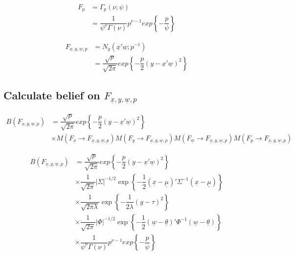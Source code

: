 \documentclass[fleqn]{minimal}
\begin{document}
\begin{align*}
  F_{p}
  & = \Gamma_p
  \left(
    \nu ;
    \psi
  \right) \\
  & = \dfrac{1}{\psi^\nu \Gamma(\nu)}
  p^{\nu-1}
  exp
  \left\{
    - \dfrac{p}{\psi}
  \right\}
\end{align*}

\begin{align*}
  F_{\underline{x}, y, \underline{w}, p}
  & = N_y
  \left(
    \underline{x}'\underline{w} ;
    p^{-1}
  \right) \\
  & =\dfrac{\sqrt{p}}{\sqrt{2\pi}}
  exp
  \left\{
    - \dfrac{p}{2}
    \left( y - \underline{x}'\underline{w} \right)^2
  \right\}
\end{align*}

\subsection{Calculate belief on $F_{\underline{x}, y, \underline{w}, p}$}

\begin{align*}
  B\left(F_{\underline{x}, y, \underline{w}, p}\right)
  & = \dfrac{\sqrt{p}}{\sqrt{2\pi}}
  exp
  \left\{
    - \dfrac{p}{2}
    \left( y - \underline{x}'\underline{w} \right)^2
  \right\} \\
  & \times
  M\left(F_{\underline{x}} \rightarrow F_{\underline{x}, y, \underline{w}, p}\right)
  M\left(F_{y} \rightarrow F_{\underline{x}, y, \underline{w}, p}\right)
  M\left(F_{\underline{w}} \rightarrow F_{\underline{x}, y, \underline{w}, p}\right)
  M\left(F_{p} \rightarrow F_{\underline{x}, y, \underline{w}, p}\right)
\end{align*}

\begin{align*}
  B\left(F_{\underline{x}, y, \underline{w}, p}\right)
  & = \dfrac{\sqrt{p}}{\sqrt{2\pi}}
  exp
  \left\{
    - \dfrac{p}{2}
    \left( y - \underline{x}'\underline{w} \right)^2
  \right\} \\
  & \times
  \dfrac{1}{\sqrt{2\pi}}
  \left| \Sigma \right|^{-1/2}
  \exp
  \left\{
    - \dfrac{1}{2}
    \left( \underline{x} - \underline{\mu}\right)'
    \Sigma^{-1}
    \left( \underline{x} - \underline{\mu}\right)
  \right\} \\
  & \times
  \dfrac{1}{\sqrt{2\pi\lambda}}
  \exp
  \left\{
    - \dfrac{1}{2\lambda}
    \left(y - \tau\right)^2
  \right\} \\
  & \times
  \dfrac{1}{\sqrt{2\pi}}
  \left| \Phi \right|^{-1/2}
  \exp
  \left\{
    - \dfrac{1}{2}
    \left( \underline{w} - \underline{\theta}\right)'
    \Phi^{-1}
    \left( \underline{w} - \underline{\theta}\right)
  \right\} \\
  & \times
  \dfrac{1}{\psi^\nu \Gamma(\nu)}
  p^{\nu-1}
  exp
  \left\{
    - \dfrac{p}{\psi}
  \right\}
\end{align*}
\end{document}
